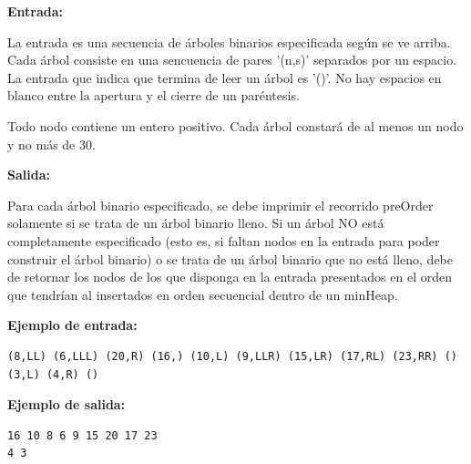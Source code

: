 \documentclass{article}
\begin{document}
\textbf{Entrada:}

La entrada es una secuencia de árboles binarios especificada según se ve arriba. Cada árbol consiste en una sencuencia de pares '(n,s)' separados por un espacio. La entrada que indica que termina de leer un árbol es '()'. No hay espacios en blanco entre la apertura y el cierre de un paréntesis.

Todo nodo contiene un entero positivo. Cada árbol constará de al menos un nodo y no más de 30.

\vspace{1cm}

\textbf{Salida:}

Para cada árbol binario especificado, se debe imprimir el recorrido preOrder solamente si se trata de un árbol binario lleno. Si un árbol NO está completamente especificado (esto es, si faltan nodos en la entrada para poder construir el árbol binario) o se trata de un árbol binario que no está lleno, debe de retornar los nodos de los que disponga en la entrada presentados en el orden que tendrían al insertados en orden secuencial dentro de un minHeap.

\vspace{0.5cm}

\textbf{Ejemplo de entrada:}

\begin{verbatim}
(8,LL) (6,LLL) (20,R) (16,) (10,L) (9,LLR) (15,LR) (17,RL) (23,RR) ()
(3,L) (4,R) ()
\end{verbatim}

\textbf{Ejemplo de salida:}

\begin{verbatim}
16 10 8 6 9 15 20 17 23
4 3
\end{verbatim}
\end{document}
